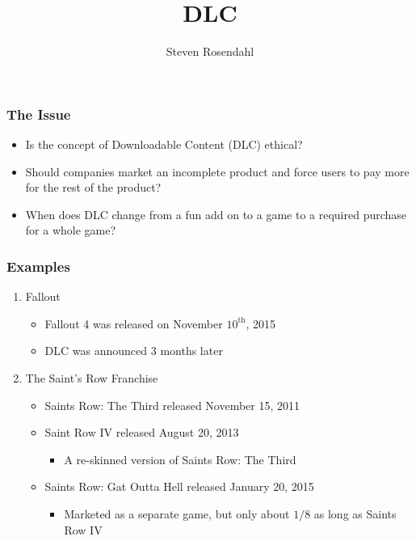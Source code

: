 \documentclass{beamer}
\title{DLC}
\author{Steven Rosendahl}
\date{}
\begin{document}
\frame{\titlepage}

\begin{frame}
\frametitle{The Issue}
\begin{itemize}
\item Is the concept of Downloadable Content (DLC) ethical?
\pause
\item Should companies market an incomplete product and force users to pay more for the rest of the product?
\pause
\item When does DLC change from a fun add on to a game to a required purchase for a whole game?
\end{itemize}
\end{frame}

\begin{frame}
\frametitle{Examples}
\begin{enumerate}
\item Fallout
\begin{itemize}
\pause
\item Fallout 4 was released on November $10^{\text{th}}$, 2015
\pause
\item DLC was announced 3 months later
\end{itemize}
\pause
\item The Saint's Row Franchise
\pause
\begin{itemize}
\item Saints Row: The Third released November 15, 2011
\pause
\item Saint Row IV released August 20, 2013
\begin{itemize}
\pause
\item A re-skinned version of Saints Row: The Third
\end{itemize}
\pause
\item Saints Row: Gat Outta Hell released January 20, 2015
\begin{itemize}
\pause
\item Marketed as a separate game, but only about $1/8$ as long as Saints Row IV
\end{itemize}
\end{itemize}
\pause
\begin{columns}[T]


\end{columns}
\end{enumerate}
\end{frame}
\end{document}
